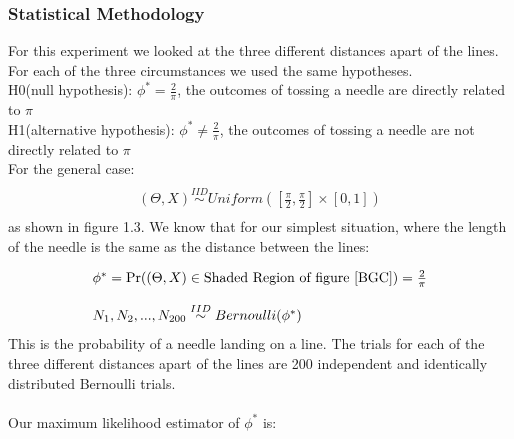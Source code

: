 \subsubsection*{Statistical Methodology}

For this experiment we looked at the three different distances apart of the lines. For each of the three circumstances we used the same hypotheses.\\
H0(null hypothesis): $\phi^*=\frac{2}{\pi}$, the outcomes of tossing a needle are directly related to $\pi$\\
H1(alternative hypothesis): $\phi^*\neq\frac{2}{\pi}$, the outcomes of tossing a needle are not directly related to $\pi$\\
For the general case:
\begin{displaymath}
\begin{array}{l}
\\(\Theta,X)\overset{IID}{\sim} Uniform([\frac{\pi}{2},\frac{\pi}{2}] \times [0,1])\\
\end{array}
\end{displaymath}
as shown in figure 1.3. We know that for our simplest situation, where the length of the needle is the same as the distance between the lines:

\begin{displaymath}
\begin{array}{l}
\phi^*=\Pr((\Theta,X)\in \text{Shaded Region of figure~\ref{BGC}})=\frac{2}{\pi}\\
\\N_1,N_2,...,N_{200} \overset{IID}{\sim} Bernoulli(\phi^*)\\
\end{array}
\end{displaymath}
This is the probability of a needle landing on a line. The trials for each of the three different distances apart of the lines are 200 independent and identically distributed Bernoulli trials.
\\
\\
\noindent
Our maximum likelihood estimator of $\phi^*$ is:

